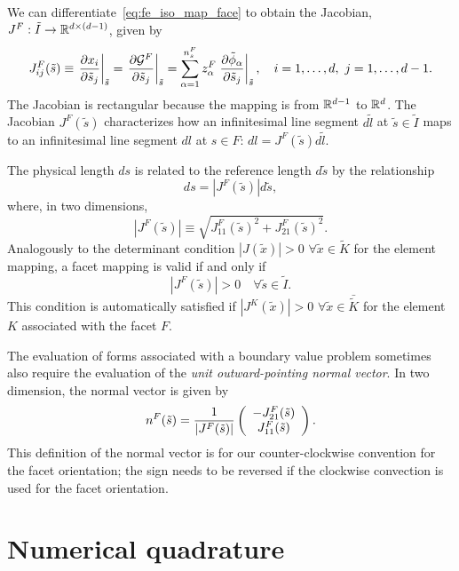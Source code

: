 We can differentiate~\eqref{eq:fe_iso_map_face} to obtain the Jacobian, $J^F: \tilde I \to \RR^{d \times (d-1)}$, given by
\begin{equation*}
  J^F_{ij}(\tilde s)
  \equiv
  \left. \pp{x_i}{\tilde s_j} \right|_{\tilde s}
  =
  \left. \pp{\calG^F}{\tilde s_j} \right|_{\tilde s}
  =
  \sum_{\alpha = 1}^{n_s^F} z^F_\alpha \left. \pp{\tilde \phi_\alpha}{\tilde s_j} \right|_{\tilde s},
  \quad i = 1,\dots,d, \ j = 1,\dots,d-1.
\end{equation*}
The Jacobian is rectangular because the mapping is from $\RR^{d-1}$ to $\RR^d$. The Jacobian $J^F(\tilde s)$ characterizes how an infinitesimal line segment $d\tilde l$ at $\tilde s \in \tilde I$ maps to an infinitesimal line segment $dl$ at $s \in F$: $dl = J^F(\tilde s) d\tilde l$.

The physical length $ds$ is related to the reference length $d\tilde s$ by the relationship
\begin{equation*}
  ds = |J^F(\tilde s)|d\tilde s,
\end{equation*}
where, in two dimensions, 
\begin{equation*}
  |J^F(\tilde s)| \equiv \sqrt{J^F_{11}(\tilde s)^2 + J^F_{21}(\tilde s)^2}.
\end{equation*}
Analogously to the determinant condition $|J(\tilde x)| > 0$ $\forall \tilde x \in \tilde K$ for the element mapping, a facet mapping is valid if and only if
\begin{equation*}
  |J^F(\tilde s)| > 0 \quad \forall \tilde s \in \tilde I.
\end{equation*}
This condition is automatically satisfied if $|J^K(\tilde x)| >0$ $\forall \tilde x \in \bar{\tilde K}$ for the element $K$ associated with the facet $F$.

The evaluation of forms associated with a boundary value problem sometimes also require the evaluation of the \emph{unit outward-pointing normal vector}. In two dimension, the normal vector is given by
\begin{equation*}
  n^F(\tilde s) = \frac{1}{|J^F(\tilde s)|} \bmat{c} -J^F_{21}(\tilde s) \\ J^F_{11}(\tilde s) \emat .
\end{equation*}
This definition of the normal vector is for our counter-clockwise convention for the facet orientation; the sign needs to be reversed if the clockwise convection is used for the facet orientation.

\section{Numerical quadrature}
\label{sec:fe_quad}
